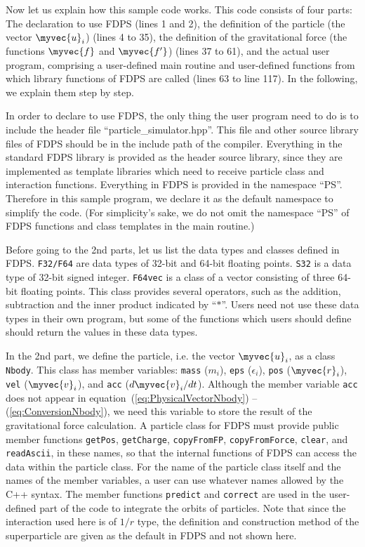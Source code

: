 Now let us explain how this sample code works. This code consists of
four parts: The declaration to use FDPS (lines 1 and 2), the
definition of the particle (the vector $\myvec{u}_i$) (lines 4 to 35),
the definition of the gravitational force (the functions $\myvec{f}$
and $\myvec{f'}$) (lines 37 to 61), and the actual user program,
comprising a user-defined main routine and user-defined functions from
which library functions of FDPS are called (lines 63 to line 117). In
the following, we explain them step by step.

In order to declare to use FDPS, the only thing the user program need
to do is to include the header file ``particle\_simulator.hpp''. This
file and other source library files of FDPS should be in the include
path of the compiler. Everything in the standard FDPS library is
provided as the header source library, since they are implemented as
template libraries which need to receive particle class and
interaction functions. Everything in FDPS is provided in the namespace
``PS''. Therefore in this sample program, we declare it as the default
namespace to simplify the code. (For simplicity's sake, we do not omit
the namespace ``PS'' of FDPS functions and class templates in the main
routine.)

Before going to the 2nd parts, let us list the data types and classes
defined in FDPS. \texttt{F32/F64} are data types of 32-bit and 64-bit
floating points. \texttt{S32} is a data type of 32-bit signed integer.
\texttt{F64vec} is a class of a vector consisting of three 64-bit
floating points. This class provides several operators, such as the
addition, subtraction and the inner product indicated by ``$*$''.
Users need not use these data types in their own program, but some of
the functions which users should define should return the values in
these data types.

In the 2nd part, we define the particle, i.e. the vector
$\myvec{u}_i$, as a class \texttt{Nbody}. This class has member
variables: \texttt{mass} ($m_i$), \texttt{eps}
($\epsilon_i$), \texttt{pos} ($\myvec{r}_i$), \texttt{vel}
($\myvec{v}_i$), and \texttt{acc} ($d\myvec{v}_i/dt$). Although the
member variable \texttt{acc} does not appear in
equation~(\ref{eq:PhysicalVectorNbody}) -- (\ref{eq:ConversionNbody}),
we need this variable to store the result of the gravitational force
calculation. A particle class for FDPS must provide public member
functions \texttt{getPos}, \texttt{getCharge}, \texttt{copyFromFP},
\texttt{copyFromForce}, \texttt{clear},
and \texttt{readAscii}, in these names, so that the internal functions
of FDPS can access the data within the particle class.  For the name
of the particle class itself and the names of the member variables, a
user can use whatever names allowed by the C++ syntax.  The member
functions \texttt{predict} and \texttt{correct} are used in the
user-defined part of the code to integrate the orbits of particles.
Note that since the interaction used here is of $1/r$ type, the
definition and construction method of the superparticle are given as
the default in FDPS and not shown here.

